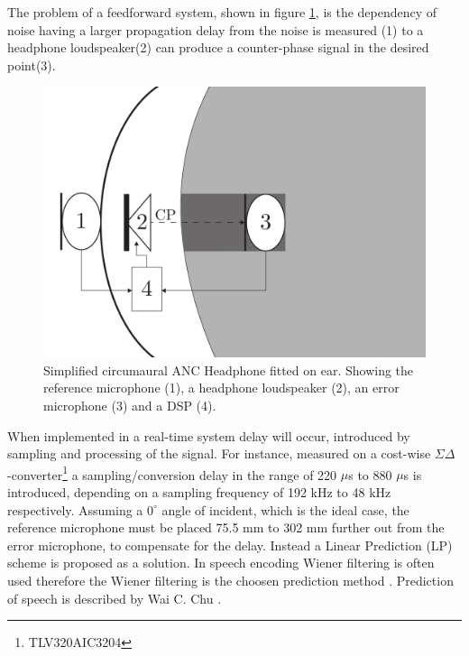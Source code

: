 The problem of a feedforward system, shown in figure \ref{fig:SystemOverview}, is the dependency of noise having a larger propagation delay from the noise is measured (1) to a headphone loudspeaker(2) can produce a counter-phase signal in the desired point(3). 

\begin{figure}[H]
	\centering
	\includegraphics[width=1\columnwidth]{figures/ArticleIllustrations/BasicOverviewZoomed}
	\caption{Simplified circumaural ANC Headphone fitted on ear. Showing the reference microphone (1), a headphone loudspeaker (2), an error microphone (3) and a DSP (4).}
	\label{fig:SystemOverview}
\end{figure}

When implemented in a real-time system delay will occur, introduced by sampling and processing of the signal. For instance, measured on a cost-wise $\Sigma\Delta$ -converter\footnote{TLV320AIC3204} a sampling/conversion delay in the range of 220 $\mu$s to 880 $\mu$s is introduced, depending on a sampling frequency of 192 kHz to 48 kHz respectively. Assuming a $\text{0}^{\circ}$ angle of incident, which is the ideal case, the reference microphone must be placed 75.5 mm to 302 mm further out from the error microphone, to compensate for the delay. Instead a Linear Prediction (LP) scheme is proposed as a solution. In speech encoding Wiener filtering is often used therefore the Wiener filtering is the choosen prediction method \cite{Speech}.
Prediction of speech is described by Wai C. Chu \cite{Speech}. 

